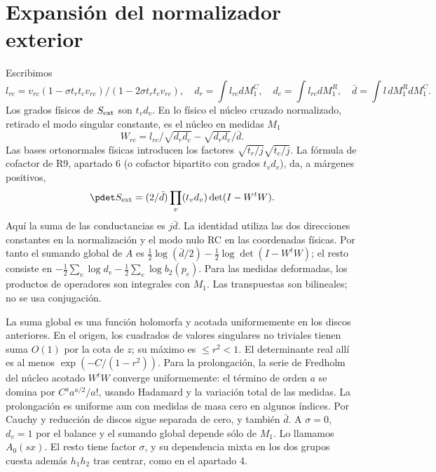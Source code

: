 \section{Expansión del normalizador exterior}
Escribimos
\[
 l_{rc}=v_{rc}(1-\sigma t_rt_c v_{rc})/(1-2\sigma t_rt_c v_{rc}),\quad
 d_r=\int l_{rc}dM_1^C,\quad d_c=\int l_{rc}dM_1^R,\quad \bar d=\int l\,dM_1^R dM_1^C .
\]
Los grados físicos de $S_{\rm ext}$ son $t_v d_v$. En lo físico el núcleo cruzado
normalizado, retirado el modo singular constante, es el núcleo en medidas $M_1$
\[
 W_{rc}=l_{rc}/\sqrt{d_rd_c}-\sqrt{d_rd_c}/\bar d .
\]
Las bases ortonormales físicas introducen los factores $\sqrt{t_r/j}\sqrt{t_c/j}$.
La fórmula de cofactor de R9, apartado 6 (o cofactor bipartito con grados $t_vd_v$),
da, a márgenes positivos,
\[
 \pdet S_{\rm ext}=(2/\bar d)\prod_v(t_vd_v)\det(I-W^tW).
\]
Aquí la suma de las conductancias es $j\bar d$. La identidad utiliza las dos direcciones
constantes en la normalización y el modo nulo RC en las coordenadas físicas.
Por tanto el sumando global de $A$ es
$\tfrac12\log(\bar d/2)-\tfrac12\log\det(I-W^t W)$; el resto consiste en
$-\tfrac12\sum_v\log d_v-\tfrac12\sum_e\log b_2(p_e)$.
Para las medidas deformadas, los productos de operadores son integrales con $M_1$.
Las transpuestas son bilineales; no se usa conjugación.

La suma global es una función holomorfa y acotada uniformemente en los discos anteriores.
En el origen, los cuadrados de valores singulares no triviales tienen suma $O(1)$ por
la cota de $z$; su máximo es $\le r^2<1$. El determinante real allí es al menos
$\exp(-C/(1-r^2))$. Para la prolongación, la serie de Fredholm del núcleo acotado
$W^tW$ converge uniformemente: el término de orden $a$ se domina por
$C^a a^{a/2}/a!$, usando Hadamard y la variación total de las medidas.
La prolongación es uniforme aun con medidas de masa cero en algunos índices.
Por Cauchy y reducción de discos sigue separada de cero, y también $\bar d$.
A $\sigma=0$, $d_v=1$ por el balance y el sumando global depende sólo de $M_1$.
Lo llamamos $A_0(sx)$. El resto tiene factor $\sigma$, y su dependencia mixta
en los dos grupos cuesta además $h_1h_2$ tras centrar, como en el apartado 4.

